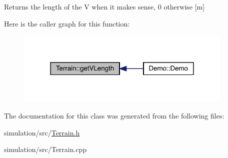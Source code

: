 \begin{DoxyReturn}{Returns}
the length of the V when it makes sense, 0 otherwise \mbox{[}m\mbox{]} 
\end{DoxyReturn}
Here is the caller graph for this function\+:\nopagebreak
\begin{figure}[H]
\begin{center}
\leavevmode
\includegraphics[width=294pt]{class_terrain_a819253da1f67d199b6347b93071961e7_icgraph}
\end{center}
\end{figure}


The documentation for this class was generated from the following files\+:\begin{DoxyCompactItemize}
\item 
simulation/src/\mbox{\hyperlink{_terrain_8h}{Terrain.\+h}}\item 
simulation/src/Terrain.\+cpp\end{DoxyCompactItemize}
